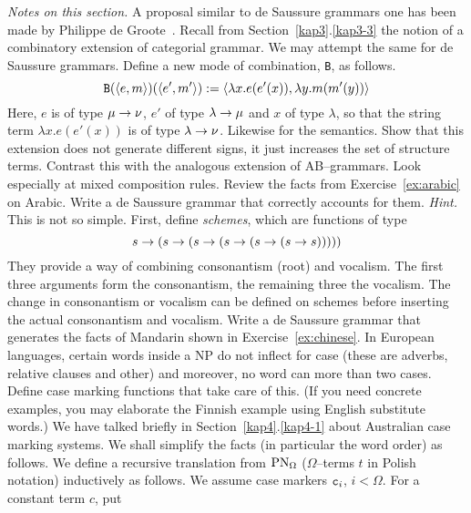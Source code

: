{\it Notes on this section.} A proposal similar to de Saussure grammars 
one has been made by Philippe de Groote~.
\vplatz
\exercise
Recall from Section~\ref{kap3}.\ref{kap3-3} the notion of a combinatory
extension of categorial grammar. We may attempt the same for
de Saussure grammars. Define a new mode of combination, {\tt B},
as follows.
\begin{equation}
\mbox{\tt B}(\langle e, m\rangle)(\langle e', m'\rangle) :=
    \langle \lambda x.e(e'(x)), \lambda y.m(m'(y))\rangle
\end{equation}
Here, $e$ is of type $\mu \rightarrow \nu$, $e'$ of type $\lambda \rightarrow \mu$
and $x$ of type $\lambda$, so that the string term $\lambda x.
e(e'(x))$ is of type $\lambda \rightarrow \nu$. Likewise for the semantics.
Show that this extension does not generate different signs, it
just increases the set of structure terms. Contrast this with
the analogous extension of AB--grammars. Look especially
at mixed composition rules.
\vplatz
\exercise
Review the facts from Exercise~\ref{ex:arabic} on Arabic. Write
a de Saussure grammar that correctly accounts for them.
{\it Hint.} This is not so simple. First, define {\it schemes},
which are functions of type 
\begin{equation}
s \rightarrow (s \rightarrow (s \rightarrow (s \rightarrow (s \rightarrow (s \rightarrow s)))))
\end{equation}
They provide a way of combining consonantism
(root) and vocalism. The first three arguments form the
consonantism, the remaining three the vocalism. The change
in consonantism or vocalism can be defined on schemes before
inserting the actual consonantism and vocalism.
\vplatz
\exercise
Write a de Saussure grammar that generates the facts of Mandarin
shown in Exercise~\ref{ex:chinese}.
\vplatz
\exercise
In European languages, certain words inside a NP do not inflect for
case (these are adverbs, relative clauses and other) and
moreover, no word can more than two cases. Define case marking
functions that take care of this. (If you need concrete examples,
you may elaborate the Finnish example using English substitute
words.)
\vplatz
\exercise
We have talked briefly in Section~\ref{kap4}.\ref{kap4-1} about Australian
case marking systems. We shall simplify the facts (in particular
the word order) as follows. We define a recursive translation from
$\operatorname{PN}_{\Omega}$ ($\Omega$--terms $t$ in Polish notation) 
inductively as follows. We assume case markers 
$\mbox{\tt c}_i$, $i < \Omega$. For a constant term $c$, put 
